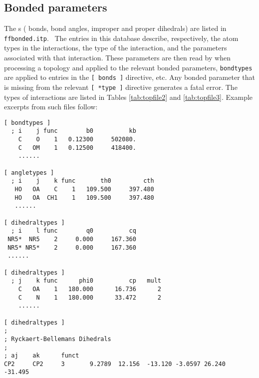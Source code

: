 \subsection{Bonded parameters}
\label{subsec:bondparam}
The s ({\ie} bonds, bond angles, improper and proper
dihedrals) are listed in {\tt ffbonded.itp}.~
The entries in this database describe, respectively, the atom types
in the interactions, the type of the interaction, and the parameters
associated with that interaction. These parameters are then read
by {\tt {}} when processing a topology and applied
to the relevant bonded parameters, {\ie} {\tt bondtypes} are applied to
entries in the {\tt [~bonds~]} directive, etc. Any bonded parameter that is
missing from the relevant {\tt [~*type~]} directive generates a fatal error.
The types of interactions are listed in Tables \ref{tab:topfile2} and 
\ref{tab:topfile3}. Example excerpts from such files follow:

{\small 
\begin{verbatim}
[ bondtypes ]
  ; i    j func        b0          kb
    C    O    1   0.12300     502080.
    C   OM    1   0.12500     418400.
    ......

[ angletypes ]
  ; i    j    k func       th0         cth
   HO   OA    C    1   109.500     397.480
   HO   OA  CH1    1   109.500     397.480
   ......

[ dihedraltypes ]
  ; i    l func        q0          cq
 NR5*  NR5    2     0.000     167.360
 NR5* NR5*    2     0.000     167.360
 ......

[ dihedraltypes ]
  ; j    k func      phi0          cp   mult
    C   OA    1   180.000      16.736      2
    C    N    1   180.000      33.472      2
    ......

[ dihedraltypes ]
;
; Ryckaert-Bellemans Dihedrals
;
; aj    ak      funct
CP2     CP2     3       9.2789  12.156  -13.120 -3.0597 26.240  -31.495
\end{verbatim}}



